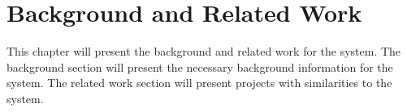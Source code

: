 \chapter{Background and Related Work}
\label{ch:background_and_related_work}

This chapter will present the background and related work for the system. The background section will present the necessary background information for the system. The related work section will present projects with similarities to the system.




